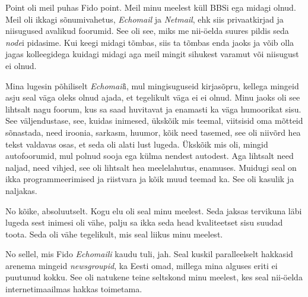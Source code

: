 
Point oli meil puhas Fido point. Meil minu meelest küll BBSi ega midagi olnud. 
Meil oli ikkagi sõnumivahetus, \emph{Echomail} ja \emph{Netmail}, ehk siis 
privaatkirjad ja niisugused avalikud foorumid. See oli see, miks me nii-öelda 
suures pildis seda \emph{node}i pidasime. Kui keegi midagi tõmbas, siis ta 
tõmbas enda jaoks ja võib olla jagas  kolleegidega kuidagi midagi aga meil 
mingit sihukest varamut või niisugust ei olnud.


Mina lugesin põhiliselt \emph{Echomail}i, mul mingisuguseid kirjasõpru, kellega 
mingeid asju seal väga oleks olnud ajada, et tegelikult väga ei ei olnud. Minu 
jaoks oli see lihtsalt nagu foorum, kus sa saad huvitavat ja enamasti ka väga 
humoorikat  sisu. See väljendustase, see, kuidas inimesed, ükskõik mis teemal, 
viitsisid oma mõtteid sõnastada, need iroonia, sarkasm, huumor, kõik need 
tasemed, see oli niivõrd hea tekst valdavas osas, et seda oli  alati lust 
lugeda. Ükskõik mis oli, mingid autofoorumid, mul polnud  sooja ega külma 
nendest autodest. Aga lihtsalt need naljad, need vihjed, see oli lihtsalt hea 
meelelahutus, enamuses. Muidugi seal on ikka programmeerimised ja riistvara ja 
kõik muud teemad ka. See oli kasulik ja naljakas.


No kõike, absoluutselt. Kogu elu oli seal minu meelest. Seda jaksas tervikuna 
läbi lugeda sest inimesi oli vähe, palju sa ikka seda head kvaliteetset sisu 
suudad toota. Seda  oli vähe tegelikult, mis seal liikus minu meelest.


No sellel, mis Fido \emph{Echomaili} kaudu tuli, jah. Seal kuskil paralleelselt 
hakkasid arenema mingeid \emph{newsgroupid}, ka Eesti omad, millega mina 
alguses eriti ei puutunud  kokku. See oli natukene teine seltskond minu 
meelest, kes seal nii-öelda internetimaailmas hakkas toimetama. 


